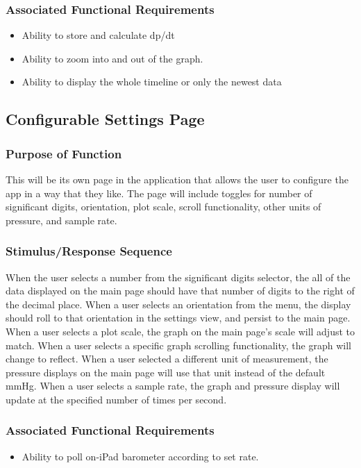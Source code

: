 \documentclass[onecolumn, draftclsnofoot,10pt, compsoc]{IEEEtran}
\begin{document}
\subsubsection{Associated Functional Requirements}
\begin{itemize}
\item Ability to store and calculate dp/dt
\item Ability to zoom into and out of the graph.
\item Ability to display the whole timeline or only the newest data
\end{itemize}

\subsection{Configurable Settings Page}
\subsubsection{Purpose of Function}
This will be its own page in the application that allows the user to configure the app in a way that they like.
The page will include toggles for number of significant digits, orientation, plot scale, scroll functionality, other units of pressure, and sample rate.

\subsubsection{Stimulus/Response Sequence}
When the user selects a number from the significant digits selector, the all of the data displayed on the main page should have that number of digits to the right of the decimal place.
When a user selects an orientation from the menu, the display should roll to that orientation in the settings view, and persist to the main page.
When a user selects a plot scale, the graph on the main page's scale will adjust to match.
When a user selects a specific graph scrolling functionality, the graph will change to reflect.
When a user selected a different unit of measurement, the pressure displays on the main page will use that unit instead of the default mmHg.
When a user selects a sample rate, the graph and pressure display will update at the specified number of times per second.

\subsubsection{Associated Functional Requirements}
\begin{itemize}
\item Ability to poll on-iPad barometer according to set rate.
\end{itemize}
\end{document}
